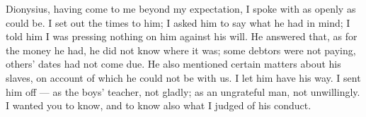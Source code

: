 

 Dionysius, having come to me beyond my expectation, I spoke with as openly as could be. I set out the times to him; I asked him to say what he had in mind; I told him I was pressing nothing on him against his will. He answered that, as for the money he had, he did not know where it was; some debtors were not paying, others' dates had not come due. He also mentioned certain matters about his slaves, on account of which he could not be with us. I let him have his way. I sent him off --- as the boys' teacher, not gladly; as an ungrateful man, not unwillingly. I wanted you to know, and to know also what I judged of his conduct.
